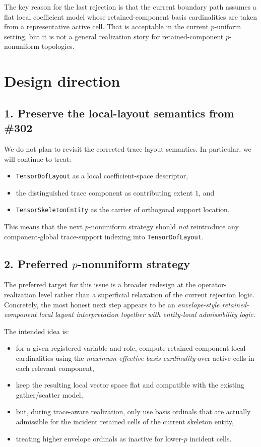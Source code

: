 \documentclass[11pt]{article}
\begin{document}
The key reason for the last rejection is that the current boundary path assumes a flat local coefficient model whose retained-component basis cardinalities are taken from a representative active cell. That is acceptable in the current \(p\)-uniform setting, but it is not a general realization story for retained-component \(p\)-nonuniform topologies.

\section{Design direction}

\subsection{1. Preserve the local-layout semantics from \#302}

We do not plan to revisit the corrected trace-layout semantics. In particular, we will continue to treat:
\begin{itemize}[leftmargin=*]
  \item \texttt{TensorDofLayout} as a local coefficient-space descriptor,
  \item the distinguished trace component as contributing extent \(1\), and
  \item \texttt{TensorSkeletonEntity} as the carrier of orthogonal support location.
\end{itemize}

This means that the next \(p\)-nonuniform strategy should \emph{not} reintroduce any component-global trace-support indexing into \texttt{TensorDofLayout}.

\subsection{2. Preferred \(p\)-nonuniform strategy}

The preferred target for this issue is a broader redesign at the operator-realization level rather than a superficial relaxation of the current rejection logic. Concretely, the most honest next step appears to be an \emph{envelope-style retained-component local layout interpretation together with entity-local admissibility logic}.

The intended idea is:
\begin{itemize}[leftmargin=*]
  \item for a given registered variable and role, compute retained-component local cardinalities using the \emph{maximum effective basis cardinality} over active cells in each relevant component,
  \item keep the resulting local vector space flat and compatible with the existing gather/scatter model,
  \item but, during trace-aware realization, only use basis ordinals that are actually admissible for the incident retained cells of the current skeleton entity,
  \item treating higher envelope ordinals as inactive for lower-\(p\) incident cells.
\end{itemize}
\end{document}
